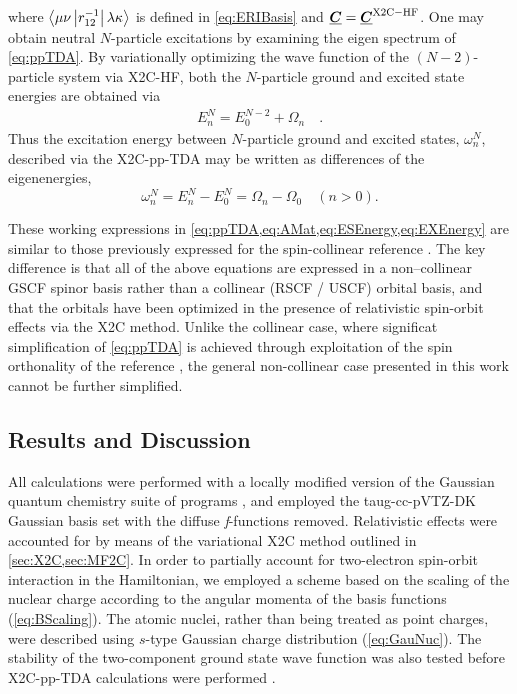 where $\left\langle \mu\nu \left\vert r^{-1}_{12} \right\vert \lambda\kappa \right\rangle$ is defined in \cref{eq:ERIBasis} and $\boldsymbol{\underline{C}} = \boldsymbol{\underline{C}}^\mathrm{X2C-HF}$. 
One may obtain neutral $N$-particle excitations by examining the eigen spectrum of \cref{eq:ppTDA}. By
variationally optimizing the wave function of the $(N-2)$-particle system via
X2C-HF, both the $N$-particle ground and excited state energies are obtained
via
\begin{align}
E_n^N = E_0^{N-2} + \Omega_n \quad . \label{eq:ESEnergy}
\end{align}
Thus the excitation energy between $N$-particle ground and excited states, $\omega_n^N$, described via the X2C-pp-TDA may be written as differences of the eigenenergies,
\begin{equation}
\omega_n^N = E_n^N - E_0^N = \Omega_n - \Omega_0 \quad (n > 0). \label{eq:EXEnergy}
\end{equation}

These working expressions in \cref{eq:ppTDA,eq:AMat,eq:ESEnergy,eq:EXEnergy}
are similar to those previously expressed for the spin-collinear
reference \cite{Yang13_224105,Yang13_18A522,Yang13_104112}. The key difference
is that all of the above equations are expressed in a non--collinear GSCF spinor 
basis rather than a collinear (RSCF / USCF) orbital basis, and that the
orbitals have been optimized in the presence of relativistic spin-orbit
effects via the X2C method.
Unlike the collinear case, where significat simplification of \cref{eq:ppTDA} is
achieved through exploitation of the spin orthonality of the reference 
\cite{Yang13_224105,Yang13_174110}, the general non-collinear case presented in this
work cannot be further simplified.

\subsection{Results and Discussion}
\label{sec:ppX2CResults}

All calculations were performed with a locally modified version of the Gaussian
quantum chemistry suite of programs \cite{GDVI04}, and employed the
taug-cc-pVTZ-DK Gaussian basis set \cite{Dixon01_48} with the diffuse \emph{f}-functions
removed.  Relativistic effects were accounted for by means of the variational
X2C method outlined in \cref{sec:X2C,sec:MF2C}.
In order
to partially account for two-electron spin-orbit interaction in the
Hamiltonian, we employed a scheme based on the scaling of the nuclear charge
according to the angular momenta of the basis functions (\cref{eq:BScaling}). The atomic nuclei,
rather than being treated as point charges, were described using $s$-type
Gaussian charge distribution (\cref{eq:GauNuc}). The stability of the
two-component ground state wave function was also tested before X2C-pp-TDA
calculations were performed \cite{Li15_154109}.

